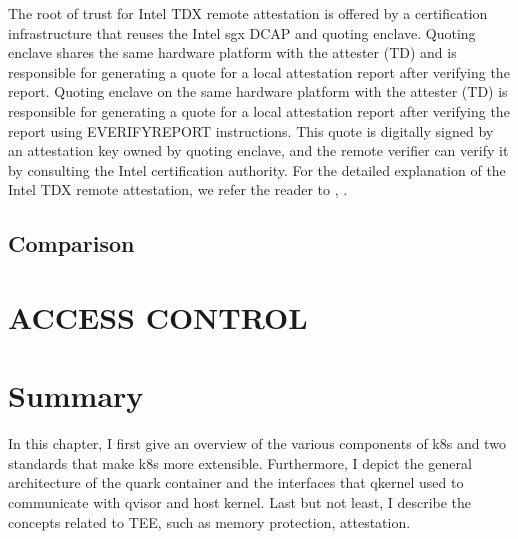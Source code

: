  
The root of trust for Intel TDX remote attestation is offered by a certification infrastructure that reuses the Intel sgx DCAP\cite*{Intel_DCAP} and quoting enclave\cite*{Intel_tdx_whitepaper}. Quoting enclave shares the same hardware 
platform with the attester (TD) and is responsible for generating a quote for a local attestation report after verifying the report. Quoting enclave on the same hardware platform with the 
attester (TD) is responsible for generating a quote for a local attestation report after verifying the report using EVERIFYREPORT instructions. This quote is digitally signed by an 
attestation key owned by quoting enclave, and the remote verifier can verify it by consulting the Intel certification authority. For the detailed explanation of the Intel TDX remote attestation, we refer the reader to \cite*{Intel_tdx_whitepaper}, \cite*{9448036}.

\subsection{Comparison}

\section{ACCESS CONTROL}

\section{Summary}
In this chapter, I first give an overview of the various components of k8s and two standards that make k8s more extensible. Furthermore, I depict the general architecture of the quark container 
and the interfaces that qkernel used to communicate with qvisor and host kernel. Last but not least, I describe the concepts related to TEE, such as memory protection, attestation.

\cleardoublepage

